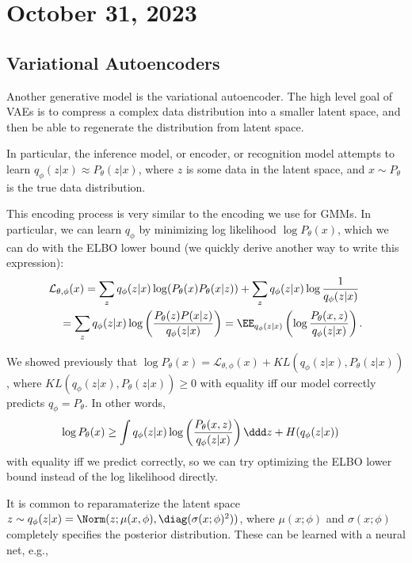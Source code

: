 \section{October 31, 2023}

\subsection{Variational Autoencoders}

Another generative model is the variational autoencoder. The high level goal of VAEs is to compress a complex data distribution into a smaller latent space, and then be able to regenerate the distribution from latent space. 

In particular, the \ac{inference model}, or \ac{encoder}, or \ac{recognition model} attempts to learn $q_{\phi}(z|x)\approx P_{\theta}(z|x)$, where $z$ is some data in the latent space, and $x\sim P_{\theta}$ is the true data distribution. 

This encoding process is very similar to the encoding we use for GMMs. In particular, we can learn $q_{\phi}$ by minimizing log likelihood $\log P_{\theta}(x)$, which we can do with the ELBO lower bound (we quickly derive another way to write this expression):
\begin{align*}
	&\mathcal{L}_{\theta, \phi}(x) = \sum_z q_{\phi}(z|x)\log(P_{\theta}(x)P_{\theta}(x|z)) + \sum_z q_{\phi}(z|x)\log\frac{1}{q_{\phi}(z|x)} \\
	&\quad= \sum_z q_{\phi}(z|x)\log\left(\frac{P_{\theta}(z)P(x|z)}{q_{\phi}(z|x)}\right) = \EE_{q_{\phi}(z|x)}\left(\log\frac{P_{\theta}(x,z)}{q_{\phi}(z|x)}\right). 
\end{align*}

We showed previously that $\log P_{\theta}(x) = \mathcal{L}_{\theta,\phi}(x) + KL(q_{\phi}(z|x), P_{\theta}(z|x))$, where $KL(q_{\phi}(z|x),P_{\theta}(z|x))\geq 0$ with equality iff our model correctly predicts $q_{\phi} = P_{\theta}$. In other words,  
\begin{align*}
	\log P_{\theta}(x) &\geq \int q_{\phi}(z|x)\log \left(\frac{P_{\theta}(x,z)}{q_{\phi}(z|x)}\right) \ddd z + H(q_{\phi}(z|x))
\end{align*}
with equality iff we predict correctly, so we can try optimizing the ELBO lower bound instead of the log likelihood directly.

It is common to reparamaterize the latent space $z\sim q_{\phi}(z|x) = \Norm(z; \mu(x,\phi),\text{\diag}(\sigma(x;\phi)^2))$, where $\mu(x;\phi)$ and $\sigma(x;\phi)$ completely specifies the posterior distribution. These can be learned with a neural net, e.g., 

